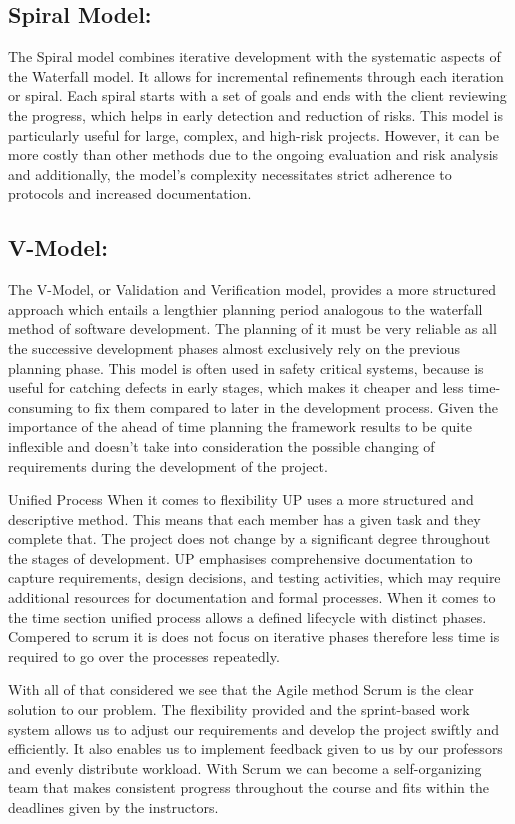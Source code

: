 \documentclass[12pt]{report}
\begin{document}
\subsection*{Spiral Model:} 
The Spiral model combines iterative development with the systematic aspects of the Waterfall model. It allows for incremental refinements through each iteration or spiral. Each spiral starts with a set of goals and ends with the client reviewing the progress, which helps in early detection and reduction of risks. This model is particularly useful for large, complex, and high-risk projects. However, it can be more costly than other methods due to the ongoing evaluation and risk analysis and additionally, the model's complexity necessitates strict adherence to protocols and increased documentation.

\subsection*{V-Model:} 
The V-Model, or Validation and Verification model, provides a more structured approach which entails a lengthier planning period analogous to the waterfall method of software development. The planning of it must be very reliable as all the successive development phases almost exclusively rely on the previous planning phase. This model is often used in safety critical systems, because is useful for catching defects in early stages, which makes it cheaper and less time-consuming to fix them compared to later in the development process. Given the importance of the ahead of time planning the framework results to be quite inflexible and doesn't take into consideration the possible changing of requirements during the development of the project.

Unified Process
When it comes to flexibility UP uses a more structured and descriptive method. This means that each member has a given task and they complete that. The project does not change by a significant degree throughout the stages of development. UP emphasises comprehensive documentation to capture requirements, design decisions, and testing activities, which may require additional resources for documentation and formal processes.
When it comes to the time section unified process allows a defined lifecycle with distinct phases. Compered to scrum it is does not focus on iterative phases therefore less time is required to go over the processes repeatedly.

With all of that considered we see that the Agile method Scrum is the clear solution to our problem. The flexibility provided and the sprint-based work system allows us to adjust our requirements and develop the project swiftly and efficiently. It also enables us to implement feedback given to us by our professors and evenly distribute workload. With Scrum we can become a self-organizing team that makes consistent progress throughout the course and fits within the deadlines given by the instructors. 
\end{document}
